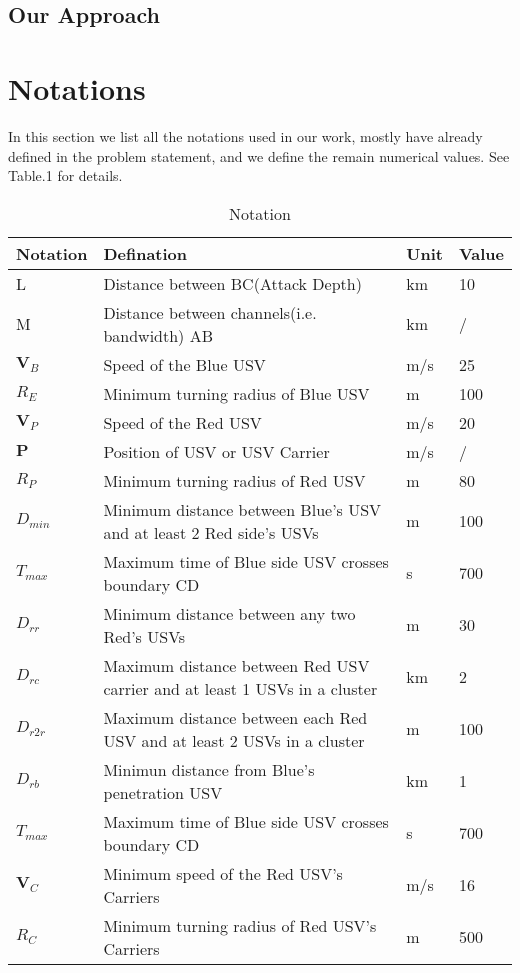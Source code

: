 \documentclass{mcmthesis}
\begin{document}
\subsection{Our Approach}

\section{Notations}

In this section we list all the notations used in our work, mostly have already defined in the problem statement, and we define the remain numerical values. See Table.1 for details.

\begin{table} [H]
\small
\centering
\caption {Notation}
\begin{tabular}{|llll|}
\hline
Notation                       & Defination                                   & Unit & Value   \\ \hline
L                              & Distance between BC(Attack Depth)            & km   & 10      \\
M                              & Distance between channels(i.e. bandwidth) AB & km   &  /       \\
$\mathbf{V}_{B}$               & Speed of the Blue USV                        & m/s  & 25      \\ 
$R_{E}$      		   & Minimum turning radius of Blue USV           & m    &100\\
$\mathbf{V}_{P}$      		   & Speed of the Red USV                        & m/s    &20\\
$\mathbf{P} $      		   & Position of USV or USV Carrier                       & m/s    &/\\
$R_{P}$      				   & Minimum turning radius of Red USV           & m    &80\\
$D_{min}$      				           & Minimum distance between Blue's USV and at least 2 Red side's USVs          & m    &100\\
$T_{max}$      				   & Maximum time of Blue side USV crosses boundary CD     &s    &700\\
$D_{rr}$      				   & Minimum distance between any two Red's USVs    &m   &30\\
$D_{rc}$      				   & Maximum distance between Red USV carrier and at least 1 USVs in a cluster      &km    &2\\
$D_{r2r}$      				   & Maximum distance between each Red USV and at least 2 USVs in a cluster      &m    &100\\
$D_{rb}$                       &Minimun distance from Blue's penetration USV     &km   & 1\\
$T_{max}$      				   & Maximum time of Blue side USV crosses boundary CD     &s    &700\\
$\mathbf{V}_{C}$      				   & Minimum speed of the Red USV's Carriers          & m/s    &16\\
$R_{C}$      				   & Minimum turning radius of Red USV's Carriers            & m    &500\\ \hline
\end{tabular}
\end{table}
\end{document}
